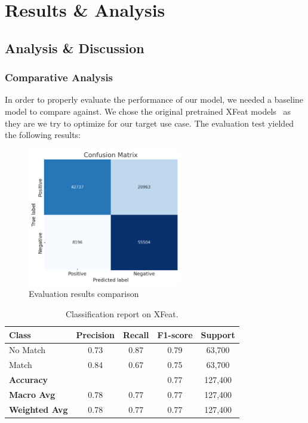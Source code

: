 \chapter{Results \& Analysis}
\section{Analysis \& Discussion}
\subsection{Comparative Analysis}
In order to properly evaluate the performance of our model, we needed a
baseline model to compare against. We chose the original pretrained XFeat
models~\cite{xfeat_github} as they are we try to optimize for our target use
case. The evaluation test yielded the following results:
\begin{figure}[H]
    \centering
    \includegraphics[width=0.6\textwidth]{ressources/xfeat_cm.png}
    \caption{Evaluation results comparison}
    \label{fig:evaluation_results}
\end{figure}
\begin{table}[H]
    \centering
    \renewcommand{\arraystretch}{1.2}
    \begin{tabular}{lcccc}
        \toprule
        \textbf{Class}        & \textbf{Precision} & \textbf{Recall} & \textbf{F1-score} & \textbf{Support} \\
        \midrule
        No Match              & 0.73               & 0.87            & 0.79              & 63,700           \\
        Match                 & 0.84               & 0.67            & 0.75              & 63,700           \\
        \midrule
        \textbf{Accuracy}     &                    &                 & 0.77              & 127,400          \\
        \textbf{Macro Avg}    & 0.78               & 0.77            & 0.77              & 127,400          \\
        \textbf{Weighted Avg} & 0.78               & 0.77            & 0.77              & 127,400          \\
        \bottomrule
    \end{tabular}
    \caption{Classification report on XFeat.}
    \label{tab:classification_report}
\end{table}
